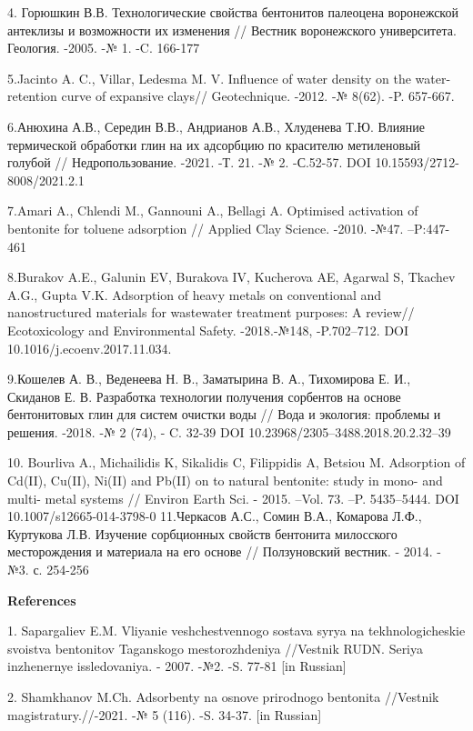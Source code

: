 4. Горюшкин В.В. Технологические свойства бентонитов палеоцена
воронежской антеклизы и возможности их изменения // Вестник воронежского
университета. Геология. -2005. -№ 1. -C. 166-177

5.Jacinto A. C., Villar, Ledesma M. V. Influence of water density on the
water-retention curve of expansive clays// Geotechnique. -2012. -№
8(62). -P. 657-667.

6.Анюхина А.В., Середин В.В., Андрианов А.В., Хлуденева Т.Ю. Влияние
термической обработки глин на их адсорбцию по красителю метиленовый
голубой // Недропользование. -2021. -Т. 21. -№ 2. -С.52-57. DOI
10.15593/2712-8008/2021.2.1

7.Amari A., Chlendi M., Gannouni A., Bellagi A. Optimised activation of
bentonite for toluene adsorption // Applied Clay Science. -2010. -№47.
--P:447-461

8.Burakov A.E., Galunin EV, Burakova IV, Kucherova AE, Agarwal S,
Tkachev A.G., Gupta V.K. Adsorption of heavy metals on conventional and
nanostructured materials for wastewater treatment purposes: A review//
Ecotoxicology and Environmental Safety. -2018.-№148, -P.702--712. DOI
10.1016/j.ecoenv.2017.11.034.

9.Кошелев А. В., Веденеева Н. В., Заматырина В. А., Тихомирова Е. И.,
Скиданов Е. В. Разработка технологии получения сорбентов на основе
бентонитовых глин для систем очистки воды // Вода и экология: проблемы и
решения. -2018. -№ 2 (74), - C. 32-39 DOI
10.23968/2305--3488.2018.20.2.32--39

10. Bourliva A., Michailidis K, Sikalidis C, Filippidis A, Betsiou M.
Adsorption of Cd(II), Cu(II), Ni(II) and Pb(II) on to natural bentonite:
study in mono- and multi- metal systems // Environ Earth Sci. - 2015.
--Vol. 73. --P. 5435--5444. DOI 10.1007/s12665-014-3798-0 11.Черкасов
А.С., Сомин В.А., Комарова Л.Ф., Куртукова Л.В. Изучение сорбционных
свойств бентонита милосского месторождения и материала на его основе //
Ползуновский вестник. - 2014. - №3. с. 254-256

{\bfseries References}

1. Sapargaliev E.M. Vliyanie veshchestvennogo sostava
syr\textquotesingle ya na tekhnologicheskie svoistva bentonitov
Taganskogo mestorozhdeniya //Vestnik RUDN. Seriya inzhenernye
issledovaniya. - 2007. -№2. -S. 77-81 {[}in Russian{]}

2. Shamkhanov M.Ch. Adsorbenty na osnove prirodnogo bentonita //Vestnik
magistratury.//-2021. -№ 5 (116). -S. 34-37. {[}in Russian{]}

